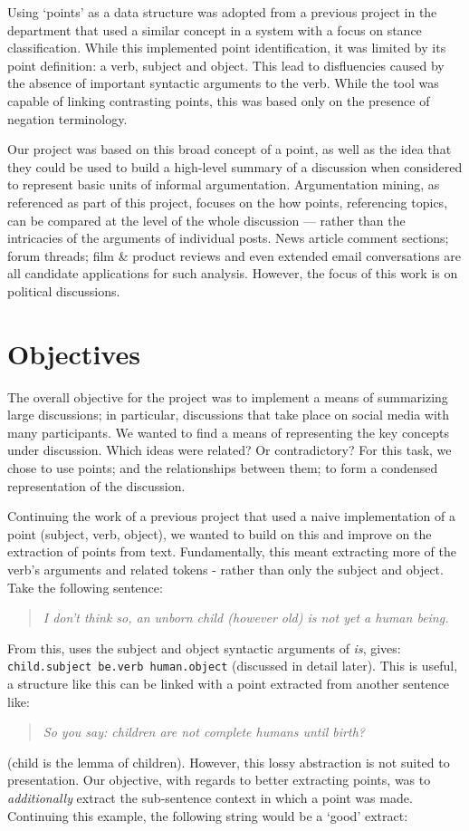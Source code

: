     Using `points' as a data structure was adopted from a previous project in the department that used a similar concept in a system with a focus on stance classification. While this implemented point identification, it was limited by its point definition: a verb, subject and object. This lead to disfluencies caused by the absence of important syntactic arguments to the verb. While the tool was capable of linking contrasting points, this was based only on the presence of negation terminology.

    Our project was based on this broad concept of a point, as well as the idea that they could be used to build a high-level summary of a discussion when considered to represent basic units of informal argumentation. Argumentation mining, as referenced as part of this project, focuses on the how points, referencing topics, can be compared at the level of the whole discussion --- rather than the intricacies of the arguments of individual posts. News article comment sections; forum threads; film \& product reviews and even extended email conversations are all candidate applications for such analysis. However, the focus of this work is on political discussions.

  \section{Objectives}
    The overall objective for the project was to implement a means of summarizing large discussions; in particular, discussions that take place on social media with many participants. We wanted to find a means of representing the key concepts under discussion. Which ideas were related? Or contradictory? For this task, we chose to use points; and the relationships between them; to form a condensed representation of the discussion.

    Continuing the work of a previous project that used a naive implementation of a point (subject, verb, object), we wanted to build on this and improve on the extraction of points from text. Fundamentally, this meant extracting more of the verb's arguments and related tokens - rather than only the subject and object. Take the following sentence:

    \medskip
    \begin{center}
    \blockquote{\textit{I don't think so, an unborn child (however old) is not yet a human being.}}
    \end{center}
    \medskip

    From this, uses the subject and object syntactic arguments of \textit{is}, gives: \texttt{child.subject be.verb human.object} (discussed in detail later). This is useful, a structure like this can be linked with a point extracted from another sentence like: \blockquote{\textit{So you say: children are not complete humans until birth?}} (child is the lemma of children). However, this lossy abstraction is not suited to presentation. Our objective, with regards to better extracting points, was to \textit{additionally} extract the sub-sentence context in which a point was made. Continuing this example, the following string would be a `good' extract:

